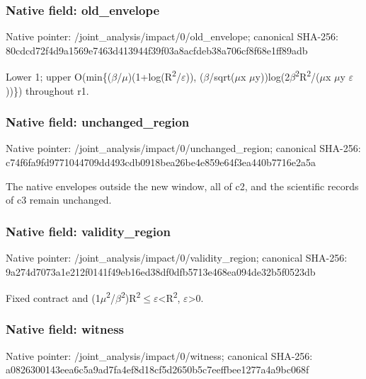\documentclass[10pt,a4paper]{article}
\begin{document}
\subsubsection{Native field: old\_envelope}


Native pointer: /joint\_analysis/impact/0/old\_envelope; canonical SHA-256: 80cdcd72f4d9a1569e7463d4\allowbreak{}13944f39f03a8acfdeb38a70\allowbreak{}6cf8f68e1ff89adb


Lower 1; upper O(min\{(\ensuremath{\beta}/\ensuremath{\mu})(1+log(R\textsuperscript{2}/\ensuremath{\varepsilon})), (\ensuremath{\beta}/sqrt(\ensuremath{\mu}x \ensuremath{\mu}y))log(2\ensuremath{\beta}\textsuperscript{2}R\textsuperscript{2}/(\ensuremath{\mu}x \ensuremath{\mu}y \ensuremath{\varepsilon}))\}) throughout r1.


\subsubsection{Native field: unchanged\_region}


Native pointer: /joint\_analysis/impact/0\allowbreak{}/unchanged\_region; canonical SHA-256: c74f6fa9fd9771044709dd49\allowbreak{}3cdb0918bea26be4e859e64f\allowbreak{}3ea440b7716e2a5a


The native envelopes outside the new window, all of c2, and the scientific records of c3 remain unchanged.


\subsubsection{Native field: validity\_region}


Native pointer: /joint\_analysis/impact/0\allowbreak{}/validity\_region; canonical SHA-256: 9a274d7073a1e212f0141f49\allowbreak{}eb16ed38df0dfb5713e468ea\allowbreak{}094de32b5f0523db


Fixed contract and (1\ensuremath{\mu}\textsuperscript{2}/\ensuremath{\beta}\textsuperscript{2})R\textsuperscript{2}\ensuremath{\le}\ensuremath{\varepsilon}<R\textsuperscript{2}, \ensuremath{\varepsilon}>0.


\subsubsection{Native field: witness}


Native pointer: /joint\_analysis/impact/0/witness; canonical SHA-256: a0826300143eea6c5a9ad7fa\allowbreak{}4ef8d18cf5d2650b5c7eeffb\allowbreak{}ee1277a4a9bc068f
\end{document}
